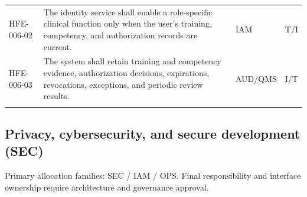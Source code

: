 \documentclass[11pt,letterpaper]{article}
\begin{document}
\begin{small}
\begin{longtable}{@{}L{0.135\textwidth}L{0.565\textwidth}L{0.125\textwidth}L{0.095\textwidth}@{}}
\addlinespace[2pt]
HFE-006-02 & The identity service shall enable a role-specific clinical function only when the user's training, competency, and authorization records are current. & IAM & T\slash\allowbreak{}I \\
\addlinespace[2pt]
HFE-006-03 & The system shall retain training and competency evidence, authorization decisions, expirations, revocations, exceptions, and periodic review results. & AUD\slash\allowbreak{}QMS & I\slash\allowbreak{}T \\
\addlinespace[2pt]
\end{longtable}
\end{small}

\subsection{Privacy, cybersecurity, and secure development (SEC)}

Primary allocation families: SEC \slash\allowbreak{} IAM \slash\allowbreak{} OPS. Final responsibility and interface ownership require architecture and governance approval.
\end{document}
